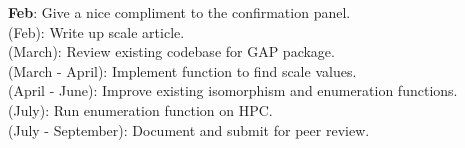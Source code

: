 \documentclass[preview]{standalone}
\begin{document}
\textbf{Feb}: Give a nice compliment to the confirmation panel.\\(Feb): Write up scale article.\\(March): Review existing codebase for GAP package.\\(March - April): Implement function to find scale values.\\(April - June): Improve existing isomorphism and enumeration functions.\\(July): Run enumeration function on HPC.\\(July - September): Document and submit for peer review.\\
\end{document}
